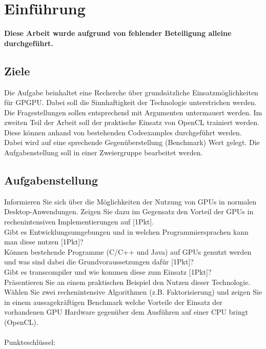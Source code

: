 \documentclass[letterpaper, 12pt]{article}
\let\tempsection\section
\renewcommand\section[1]{\vspace{-0.3cm}\tempsection{#1}\vspace{-0.3cm}}
\let\tempsubsection\subsection
\renewcommand\subsection[1]{\vspace{0cm}\tempsubsection{#1}\vspace{0cm}}
\begin{document}
\parindent 0pt
\parskip 6pt



\clearpage
\thispagestyle{empty}
\tableofcontents

\newpage
{}
\pagestyle{fancy}

\section{Einführung}
\textbf{Diese Arbeit wurde aufgrund von fehlender Beteiligung alleine durchgeführt.}
\subsection{Ziele}
Die Aufgabe beinhaltet eine Recherche über grundsätzliche Einsatzmöglichkeiten für GPGPU. Dabei soll die Sinnhaftigkeit der Technologie unterstrichen werden. Die Fragestellungen sollen entsprechend mit Argumenten untermauert werden.
Im zweiten Teil der Arbeit soll der praktische Einsatz von OpenCL trainiert werden. Diese können anhand von bestehenden Codeexamples durchgeführt werden. Dabei wird auf eine sprechende Gegenüberstellung (Benchmark) Wert gelegt.
Die Aufgabenstellung soll in einer Zweiergruppe bearbeitet werden.

\subsection{Aufgabenstellung}
Informieren Sie sich über die Möglichkeiten der Nutzung von GPUs in normalen Desktop-Anwendungen. Zeigen Sie dazu im Gegensatz den Vorteil der GPUs in rechenintensiven Implementierungen auf [1Pkt]. \\
Gibt es Entwicklungsumgebungen und in welchen Programmiersprachen kann man diese nutzen [1Pkt]? \\
Können bestehende Programme (C/C++ und Java) auf GPUs genutzt werden und was sind dabei die Grundvoraussetzungen dafür [1Pkt]? \\ Gibt es transcompiler und wie kommen diese zum Einsatz [1Pkt]? \\

Präsentieren Sie an einem praktischen Beispiel den Nutzen dieser Technologie. Wählen Sie zwei rechenintensive Algorithmen (z.B. Faktorisierung) und zeigen Sie in einem aussagekräftigen Benchmark welche Vorteile der Einsatz der vorhandenen GPU Hardware gegenüber dem Ausführen auf einer CPU bringt (OpenCL). \\  \\ Punkteschlüssel: \\
\end{document}
